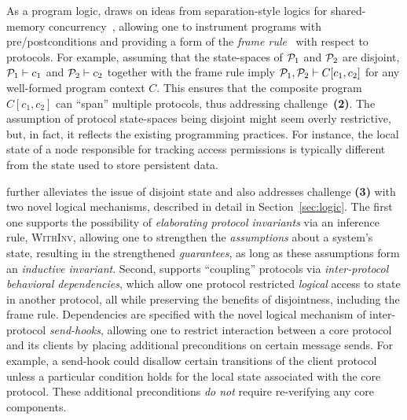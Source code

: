 As a program logic, \disel draws on ideas from separation-style logics
for shared-memory
concurrency~\cite{Nanevski-al:ESOP14,Turon-al:OOPSLA14}, allowing one
to instrument programs with pre/postconditions and providing a form of
the \emph{frame rule}~\cite{Reynolds:LICS02} with respect to
protocols. For example, assuming that the state-spaces of $\mathcal{P}_1$ and
$\mathcal{P}_2$ are disjoint, $\mathcal{P}_1 \vdash c_1$ and $\mathcal{P}_2 \vdash c_2$
together with the frame rule imply $\mathcal{P}_1, \mathcal{P}_2 \vdash C[c_1, c_2]$
for any well-formed program context $C$.
%
This ensures that
the composite program $C[c_1, c_2]$ can ``span''
multiple protocols, thus addressing challenge~\textbf{(2)}.
%
The assumption of protocol state-spaces being disjoint might seem overly
restrictive, but, in fact, it reflects the existing programming
practices.
%
For instance, the local state of a node responsible for
tracking access permissions is typically different from the state
used to store persistent data.

\disel further alleviates the issue of disjoint state and also
addresses challenge \textbf{(3)} with two novel logical mechanisms,
described in detail in Section~\ref{sec:logic}.
%
The first one supports the possibility of \emph{elaborating protocol
  invariants} via an inference rule, \textsc{WithInv}, allowing one to
strengthen the \emph{assumptions} about a system's state, resulting in
the strengthened \emph{guarantees}, as long as these assumptions form
an \emph{inductive invariant}.
%
Second, \disel supports ``coupling'' protocols via
\emph{inter-protocol behavioral dependencies}, which allow one
protocol restricted \emph{logical} access to state in another
protocol, all while preserving the benefits of disjointness, including
the frame rule.
%
Dependencies are specified with the novel logical mechanism of
inter-protocol \emph{send-hooks}, allowing one to restrict interaction
between a core protocol and its clients by placing additional
preconditions on certain message sends.
%
For example, a send-hook could disallow certain transitions of the
client protocol unless a particular condition holds for the local
state associated with the core protocol.
%
These additional preconditions \emph{do not} require re-verifying any
core components.


